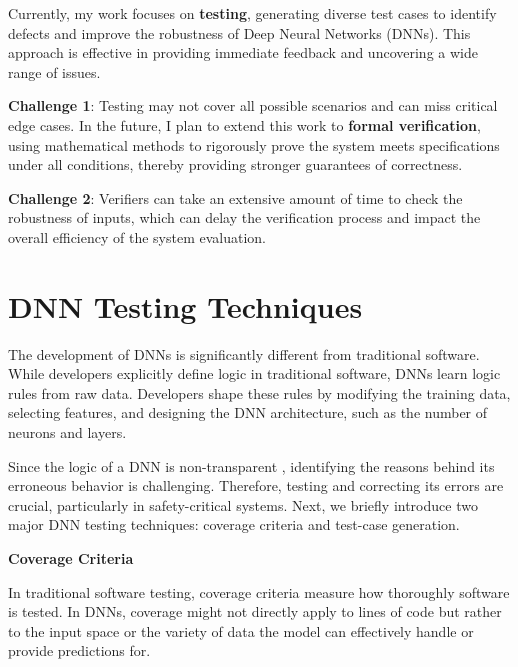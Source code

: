 \begin{tcolorbox}[colback=purple!2!white, colframe=purple]

  Currently, my work focuses on \textbf{testing}, generating diverse test cases to identify defects and improve the robustness of Deep Neural Networks (DNNs). This approach is effective in providing immediate feedback and uncovering a wide range of issues.
  
  \textbf{Challenge 1}: Testing may not cover all possible scenarios and can miss critical edge cases. In the future, I plan to extend this work to \textbf{formal verification}, using mathematical methods to rigorously prove the system meets specifications under all conditions, thereby providing stronger guarantees of correctness.
  
  \textbf{Challenge 2}: Verifiers can take an extensive amount of time to check the robustness of inputs, which can delay the verification process and impact the overall efficiency of the system evaluation.
  
  \end{tcolorbox}





\section{DNN Testing Techniques}

The development of DNNs is significantly different from traditional software. While developers explicitly define logic in traditional software, DNNs learn logic rules from raw data. Developers shape these rules by modifying the training data, selecting features, and designing the DNN architecture, such as the number of neurons and layers.

Since the logic of a DNN is non-transparent \cite{deepxplore}, identifying the reasons behind its erroneous behavior is challenging. Therefore, testing and correcting its errors are crucial, particularly in safety-critical systems. Next, we briefly introduce two major DNN testing techniques: coverage criteria and test-case generation.

\smallskip\noindent%
\textbf{Coverage Criteria}

In traditional software testing, coverage criteria measure how thoroughly software is tested. In DNNs, coverage might not directly apply to lines of code but rather to the input space or the variety of data the model can effectively handle or provide predictions for.

